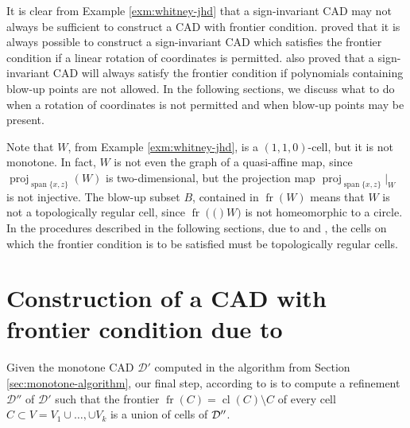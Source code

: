\documentclass[
]{book}
\theoremstyle{definition}
\theoremstyle{definition}
\theoremstyle{definition}
\theoremstyle{definition}
\theoremstyle{remark}
\begin{document}
It is clear from Example \ref{exm:whitney-jhd} that a sign-invariant CAD may not always be sufficient to construct a CAD with frontier condition. \citet{pianomovers1983} proved that it is always possible to construct a sign-invariant CAD which satisfies the frontier condition if a linear rotation of coordinates is permitted. \citet{jhd20} also proved that a sign-invariant CAD will always satisfy the frontier condition if polynomials containing blow-up points are not allowed. In the following sections, we discuss what to do when a rotation of coordinates is not permitted and when blow-up points may be present.

Note that \(W\), from Example \ref{exm:whitney-jhd}, is a \((1,1,0)\)-cell, but it is not monotone. In fact, \(W\) is not even the graph of a quasi-affine map, since \({\operatorname{proj}_{{\operatorname{span} \{x,z\}}}}(W)\) is two-dimensional, but the projection map \({\operatorname{proj}_{{\operatorname{span} \{x,z\}}}}\vert_W\) is not injective. The blow-up subset \(B\), contained in \({\operatorname{fr} \left( W \right)}\) means that \(W\) is not a topologically regular cell, since \({\operatorname{fr} \left( ( \right)}W)\) is not homeomorphic to a circle.
In the procedures described in the following sections, due to \citet{bgv15} and \citet{lazard10}, the cells on which the frontier condition is to be satisfied must be topologically regular cells.

\hypertarget{sec:frontier-bgv}{%
\section{\texorpdfstring{Construction of a CAD with frontier condition due to \citet{bgv15}}{Construction of a CAD with frontier condition due to @bgv15}}\label{sec:frontier-bgv}}

Given the monotone CAD \(\mathcal{D'}\) computed in the algorithm from Section \ref{sec:monotone-algorithm}, our final step, according to \citep[Theorem 3.20]{bgv15} is to compute a refinement \(\mathcal{D''}\) of \(\mathcal{D'}\) such that the frontier \({\operatorname{fr} \left( C \right)} = {\operatorname{cl} \left( C \right)} \setminus C\) of every cell \(C \subset V = V_1\cup \ldots, \cup V_k\) is a union of cells of \(\cal D''\).
\end{document}
